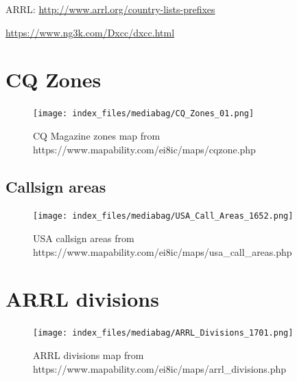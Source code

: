 \documentclass[
  letterpaper,
  DIV=11,
  numbers=noendperiod]{scrreport}
\begin{document}

ARRL: \url{http://www.arrl.org/country-lists-prefixes}

\url{https://www.ng3k.com/Dxcc/dxcc.html}

\hypertarget{cq-zones}{%
\section*{CQ Zones}\label{cq-zones}}


\begin{figure}

{\centering \texttt{[image: index\_files/mediabag/CQ\_Zones\_01.png]}

}

\caption{CQ Magazine zones map from
https://www.mapability.com/ei8ic/maps/cqzone.php}

\end{figure}

\hypertarget{callsign-areas}{%
\subsection*{Callsign areas}\label{callsign-areas}}

\begin{figure}

{\centering \texttt{[image: index\_files/mediabag/USA\_Call\_Areas\_1652.png]}

}

\caption{USA callsign areas from
https://www.mapability.com/ei8ic/maps/usa\_call\_areas.php}

\end{figure}

\hypertarget{arrl-divisions}{%
\section*{ARRL divisions}\label{arrl-divisions}}


\begin{figure}

{\centering \texttt{[image: index\_files/mediabag/ARRL\_Divisions\_1701.png]}

}

\caption{ARRL divisions map from
https://www.mapability.com/ei8ic/maps/arrl\_divisions.php}

\end{figure}
\end{document}
